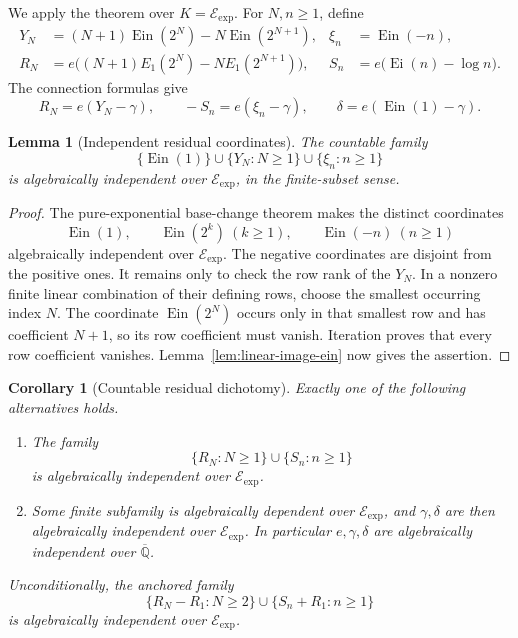 \documentclass[11pt]{article}
\newtheorem{corollary}[theorem]{Corollary}
\newtheorem{lemma}[theorem]{Lemma}
\theoremstyle{definition}
\theoremstyle{remark}
\newcommand{\Qbar}{\overline{\mathbb Q}}
\newcommand{\Ein}{\operatorname{Ein}}
\newcommand{\Ei}{\operatorname{Ei}}
\newcommand{\Eexp}{\mathcal E_{\mathrm{exp}}}
\begin{document}
We apply the theorem over \(K=\Eexp\).  For \(N,n\geq1\), define
\begin{align}
 Y_N&=(N+1)\Ein(2^N)-N\Ein(2^{N+1}),
 &\xi_n&=\Ein(-n),\label{eq:residual-Ein-coordinates}\\
 R_N&=e\bigl((N+1)E_1(2^N)-N E_1(2^{N+1})\bigr),
 &S_n&=e\bigl(\Ei(n)-\log n\bigr).
 \label{eq:residual-classical-coordinates}
\end{align}
The connection formulas give
\begin{equation}\label{eq:residual-common-shift}
 R_N=e(Y_N-\gamma),
 \qquad
 -S_n=e(\xi_n-\gamma),
 \qquad
 \delta=e(\Ein(1)-\gamma).
\end{equation}

\begin{lemma}[Independent residual coordinates]
\label{lem:residual-Ein-independent}
The countable family
\[
 \{\Ein(1)\}\cup\{Y_N:N\geq1\}\cup\{\xi_n:n\geq1\}
\]
is algebraically independent over \(\Eexp\), in the finite-subset sense.
\end{lemma}

\begin{proof}
The pure-exponential base-change theorem makes the distinct coordinates
\[
 \Ein(1),\qquad \Ein(2^k)\ (k\geq1),\qquad \Ein(-n)\ (n\geq1)
\]
algebraically independent over \(\Eexp\).  The negative coordinates are
disjoint from the positive ones.  It remains only to check the row rank of
the \(Y_N\).  In a nonzero finite linear combination of their defining
rows, choose the smallest occurring index \(N\).  The coordinate
\(\Ein(2^N)\) occurs only in that smallest row and has coefficient \(N+1\),
so its row coefficient must vanish.  Iteration proves that every row
coefficient vanishes.  Lemma~\ref{lem:linear-image-ein} now gives the
assertion.
\end{proof}

\begin{corollary}[Countable residual dichotomy]
\label{cor:countable-residual-dichotomy}
Exactly one of the following alternatives holds.
\begin{enumerate}[label=\textup{(\roman*)}]
 \item The family
 \[
  \{R_N:N\geq1\}\cup\{S_n:n\geq1\}
 \]
 is algebraically independent over \(\Eexp\).
 \item Some finite subfamily is algebraically dependent over \(\Eexp\),
 and \(\gamma,\delta\) are then algebraically independent over
 \(\Eexp\).  In particular \(e,\gamma,\delta\) are algebraically
 independent over \(\Qbar\).
\end{enumerate}
Unconditionally, the anchored family
\begin{equation}\label{eq:anchored-residual-family}
 \boxed{
 \{R_N-R_1:N\geq2\}\cup\{S_n+R_1:n\geq1\}}
\end{equation}
is algebraically independent over \(\Eexp\).
\end{corollary}
\end{document}
